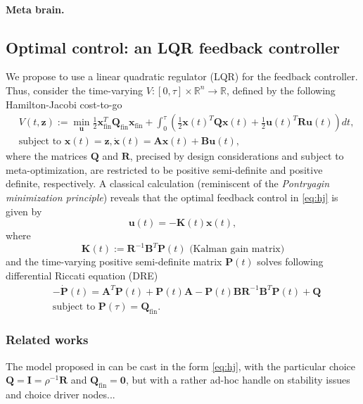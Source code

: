 \documentclass{article} %
\def\B#1{\bm{#1}}
\newcommand{\R}{\mathbb{R}}
\def\u{\mathbf{u}}
\def\z{\mathbf{z}}
\def\A{\mathbf{A}}
\def\B{\mathbf{B}}
\def\R{\mathbf{R}}
\def\Q{\mathbf{Q}}
\def\P{\mathbf{P}}
\def\K{\mathbf{K}}
\def\x{\mathbf{x}}
\begin{document}
\paragraph{Meta brain.}

\subsection{Optimal control: an LQR feedback controller}
We propose to use a linear quadratic regulator (LQR) for the feedback controller. Thus, consider the time-varying  $V: [0, \tau] \times \mathbb R^n \rightarrow \mathbb R$, defined by the following Hamilton-Jacobi cost-to-go
\begin{equation}
  \begin{split}
    &V(t, \z) := \min_{\u} \frac{1}{2}\x_{\text{fin}}^T\Q_{\text{fin}}\x_{\text{fin}} + \int_{0}^\tau\left(\frac{1}{2}\x(t)^T\Q\x(t) + \frac{1}{2}\u(t)^T\R\u(t)\right)dt,\\
    &\text{subject to } \x(t) = \z, \dot{\x}(t) = \A\x(t) + \B\u(t),
  \end{split}
  \label{eq:hj}
\end{equation}
where the matrices $\Q$ and $\R$, precised by design considerations and subject to meta-optimization, are restricted to be positive semi-definite and positive definite, respectively. A classical calculation (reminiscent of the \textit{Pontryagin minimization principle}) reveals that the optimal feedback control in \eqref{eq:hj} is given by
\begin{equation}
  \u(t) = -\K(t)\x(t),
\end{equation}
where
\begin{equation}
  \K(t) := \R^{-1}\B^T\P(t)\text{ (Kalman gain matrix)}
\end{equation}
and the time-varying positive semi-definite matrix $\P(t)$ solves following differential Riccati equation (DRE)
\begin{equation}
\begin{split}
&-\dot{\P}(t) = \A^T\P(t) + \P(t)\A - \P(t)\B\R^{-1}\B^T\P(t) + \Q\\
&\text{subject to }\P(\tau) = \Q_{\text{fin}}.
\end{split}
\end{equation}
\subsubsection{Related works}
The model proposed in \cite{betzel2016} can be cast in the form \eqref{eq:hj}, with the particular choice $\Q = \textbf{I} = \rho^{-1}\R$ and $\Q_{\text{fin}} = \textbf{0}$, but with a rather ad-hoc handle on stability issues and choice driver nodes...
\end{document}
